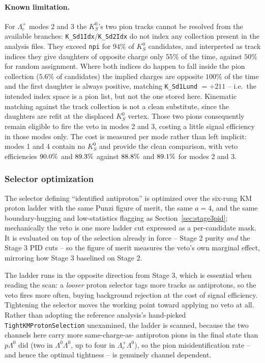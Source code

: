 \paragraph{Known limitation.} For $\Lambda_c^+$ modes 2 and 3 the $K_S^0$'s
two pion tracks cannot be resolved from the available branches:
\texttt{K\_Sd1Idx}/\texttt{K\_Sd2Idx} do not index any collection present in
the analysis files. They exceed \texttt{npi} for $94\%$ of $K_S^0$
candidates, and interpreted as track indices they give daughters of opposite
charge only $55\%$ of the time, against $50\%$ for random assignment. Where
both indices do happen to fall inside the pion collection ($5.6\%$ of
candidates) the implied charges are opposite $100\%$ of the time and the
first daughter is always positive, matching \texttt{K\_Sd1Lund} $= +211$ --
i.e.\ the intended index space is a pion list, but not the one stored here.
Kinematic matching against the track collection is not a clean substitute,
since the daughters are refit at the displaced $K_S^0$ vertex. Those two
pions consequently remain eligible to fire the veto in modes 2 and 3,
costing a little signal efficiency in those modes only. The cost is measured
per mode rather than left implicit: modes 1 and 4 contain no $K_S^0$ and
provide the clean comparison, with veto efficiencies
$90.0\%$ and $89.3\%$ against
$88.8\%$ and $89.1\%$ for modes
2 and 3.

\subsubsection{Selector optimization}

The selector defining ``identified antiproton'' is optimized over the
six-rung KM proton ladder with the same Punzi figure of merit, the same
$a = 4$, and the same boundary-hugging and low-statistics flagging as
Section~\ref{sec:stage3pid}; mechanically the veto is one more ladder cut
expressed as a per-candidate mask. It is evaluated on top of the selection
already in force -- Stage 2 purity \emph{and} the Stage 3 PID cuts -- so the
figure of merit measures the veto's own marginal effect, mirroring how
Stage 3 baselined on Stage 2.

The ladder runs in the opposite direction from Stage 3, which is essential
when reading the scan: a \emph{looser} proton selector tags more tracks as
antiprotons, so the veto fires more often, buying background rejection at
the cost of signal efficiency. Tightening the selector moves the working
point toward applying no veto at all. Rather than adopting the reference
analysis's hand-picked \texttt{TightKMProtonSelection} unexamined, the
ladder is scanned, because the two channels here carry more same-charge-as-
antiproton pions in the final state than $p\Lambda^0$ did (two in
$\Lambda^0\Lambda^0$, up to four in $\Lambda_c^+\Lambda^0$), so the pion
misidentification rate -- and hence the optimal tightness -- is genuinely
channel dependent.

